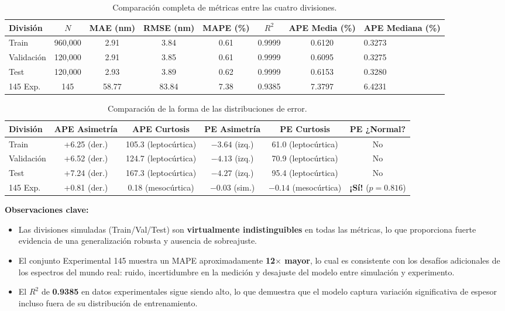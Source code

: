 \documentclass{article}
\begin{document}
\begin{table}[htbp]
\centering
\caption{Comparación completa de métricas entre las cuatro divisiones.}
\label{tab:cross-split}
\begin{tabular}{lcccccc}
\hline
División & $N$ & MAE (nm) & RMSE (nm) & MAPE (\%) & $R^2$ & APE Media (\%) & APE Mediana (\%) \\
\hline
Train      & 960,000 & 2.91  & 3.84  & 0.61 & 0.9999 & 0.6120 & 0.3273 \\
Validación & 120,000 & 2.91  & 3.85  & 0.61 & 0.9999 & 0.6095 & 0.3275 \\
Test       & 120,000 & 2.93  & 3.89  & 0.62 & 0.9999 & 0.6153 & 0.3280 \\
145 Exp.   & 145     & 58.77 & 83.84 & 7.38 & 0.9385 & 7.3797 & 6.4231 \\
\hline
\end{tabular}
\end{table}

\begin{table}[htbp]
\centering
\caption{Comparación de la forma de las distribuciones de error.}
\label{tab:dist-shape}
\begin{tabular}{lccccc}
\hline
División & APE Asimetría & APE Curtosis & PE Asimetría & PE Curtosis & PE ¿Normal? \\
\hline
Train      & +6.25 (der.) & 105.3 (leptocúrtica) & $-3.64$ (izq.) & 61.0 (leptocúrtica) & No \\
Validación & +6.52 (der.) & 124.7 (leptocúrtica) & $-4.13$ (izq.) & 70.9 (leptocúrtica) & No \\
Test       & +7.24 (der.) & 167.3 (leptocúrtica) & $-4.27$ (izq.) & 95.4 (leptocúrtica) & No \\
145 Exp.   & +0.81 (der.) & 0.18 (mesocúrtica)  & $-0.03$ (sim.)  & $-0.14$ (mesocúrtica) & \textbf{¡Sí!} ($p = 0.816$) \\
\hline
\end{tabular}
\end{table}

\textbf{Observaciones clave:}
\begin{itemize}
\item Las divisiones simuladas (Train/Val/Test) son \textbf{virtualmente indistinguibles} en todas las métricas, lo que proporciona fuerte evidencia de una generalización robusta y ausencia de sobreajuste.
\item El conjunto Experimental 145 muestra un MAPE aproximadamente \textbf{12$\times$ mayor}, lo cual es consistente con los desafíos adicionales de los espectros del mundo real: ruido, incertidumbre en la medición y desajuste del modelo entre simulación y experimento.
\item El $R^2$ de \textbf{0.9385} en datos experimentales sigue siendo alto, lo que demuestra que el modelo captura variación significativa de espesor incluso fuera de su distribución de entrenamiento.
\end{itemize}
\end{document}

